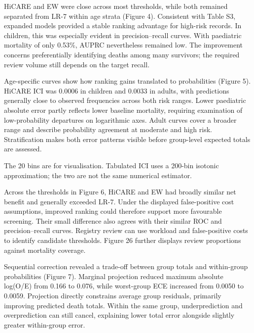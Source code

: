 \documentclass[11pt,a4paper]{article}
\newcommand{\subheading}[1]{\par\needspace{3\baselineskip}\vspace{5pt}{\bfseries #1}\par\vspace{1pt}}
\begin{document}
\subheading{Figure 4. Cross-validated (A) receiver operating characteristic and (B) precision–recall curves.}
HiCARE and EW were close across most thresholds, while both remained separated from LR-7 within age strata (Figure 4). Consistent with Table S3, expanded models provided a stable ranking advantage for high-risk records. In children, this was especially evident in precision–recall curves. With paediatric mortality of only 0.53\%, AUPRC nevertheless remained low. The improvement concerns preferentially identifying deaths among many survivors; the required review volume still depends on the target recall.

\subheading{Figure 5. Cross-validated calibration in 20 predicted-risk quantile bins on logarithmic axes.}
Age-specific curves show how ranking gains translated to probabilities (Figure 5). HiCARE ICI was 0.0006 in children and 0.0033 in adults, with predictions generally close to observed frequencies across both risk ranges. Lower paediatric absolute error partly reflects lower baseline mortality, requiring examination of low-probability departures on logarithmic axes. Adult curves cover a broader range and describe probability agreement at moderate and high risk. Stratification makes both error patterns visible before group-level expected totals are assessed.

{\small The 20 bins are for visualisation. Tabulated ICI uses a 200-bin isotonic approximation; the two are not the same numerical estimator.\par}
\subheading{Figure 6. Cross-validated decision curves.}
Across the thresholds in Figure 6, HiCARE and EW had broadly similar net benefit and generally exceeded LR-7. Under the displayed false-positive cost assumptions, improved ranking could therefore support more favourable screening. Their small difference also agrees with their similar ROC and precision–recall curves. Registry review can use workload and false-positive costs to identify candidate thresholds. Figure 26 further displays review proportions against mortality coverage.

\subheading{Figure 7. Contributions of facility profiles and second-layer components in cross-validation.}
Sequential correction revealed a trade-off between group totals and within-group probabilities (Figure 7). Marginal projection reduced maximum absolute log(O/E) from 0.166 to 0.076, while worst-group ECE increased from 0.0050 to 0.0059. Projection directly constrains average group residuals, primarily improving predicted death totals. Within the same group, underprediction and overprediction can still cancel, explaining lower total error alongside slightly greater within-group error.
\end{document}
